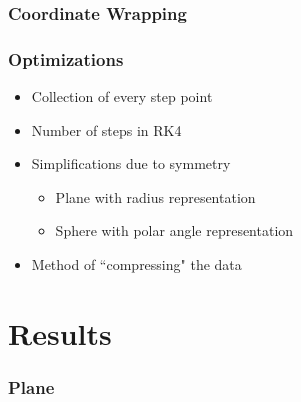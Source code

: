 \documentclass{beamer}
\begin{document}

\begin{frame}
	
	\frametitle{Coordinate Wrapping}
	
	\begin{figure}
		
	\end{figure}
	
\end{frame}

\begin{frame}
	
	\frametitle{Optimizations}
	
	\begin{itemize}
		\item Collection of every step point
		\item Number of steps in RK4
		\item Simplifications due to symmetry
		\begin{itemize}
			\item Plane with radius representation
			\item Sphere with polar angle representation
		\end{itemize}
		\item Method of ``compressing" the data
	\end{itemize}
	
\end{frame}

\section{Results}


\begin{frame}
	
	\frametitle{Plane}
	
	\begin{figure}
		
	\end{figure}
	
\end{frame}
\end{document}
